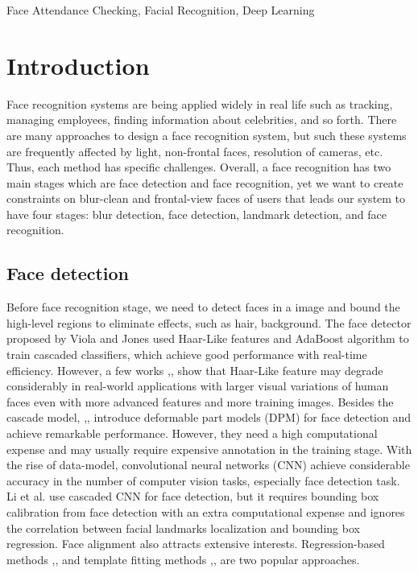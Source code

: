 \documentclass[journal, twocolumn]{IEEEtran}
\begin{document}
\begin{IEEEkeywords}
Face Attendance Checking, Facial Recognition, Deep Learning
\end{IEEEkeywords}


\IEEEpeerreviewmaketitle


\section{Introduction}
\label{introduction}

Face recognition systems are being applied widely in real life such as tracking, managing employees, finding information about celebrities, and so forth. There are many approaches to design a face recognition system, but such these systems are frequently affected by light, non-frontal faces, resolution of cameras, etc. Thus, each method has specific challenges. Overall, a face recognition has two main stages which are face detection and face recognition, yet we want to create constraints on blur-clean and frontal-view faces of users that leads our system to have four stages: blur detection, face detection, landmark detection, and face recognition.  


\subsection{Face detection}
Before face recognition stage, we need to detect faces in a image and bound the high-level regions to eliminate effects, such as hair, background. The face detector proposed by Viola and Jones \cite{ref:detect-1} used Haar-Like features and AdaBoost algorithm to train cascaded classifiers, which achieve good performance with real-time efficiency. However, a few works \cite{ref:detect-2},\cite{ref:detect-3},\cite{ref:detect-4} show that Haar-Like feature may degrade considerably in real-world applications with larger visual variations of human faces even with more advanced features and more training images. Besides the cascade model, \cite{ref:detect-5},\cite{ref:detect-6},\cite{ref:detect-7} introduce deformable part models (DPM) for face detection and achieve remarkable performance. However, they need a high computational expense and may usually require expensive annotation in the training stage. With the rise of data-model, convolutional neural networks (CNN) achieve considerable accuracy in the number of computer vision tasks, especially face detection task. Li et al. \cite{ref:detect-8} use cascaded CNN for face detection, but it requires bounding box calibration from face detection with an extra computational expense and ignores the correlation between facial landmarks localization and bounding box regression. Face alignment also attracts extensive interests. Regression-based methods \cite{ref:detect-9},\cite{ref:detect-10},\cite{ref:detect-11} and template fitting methods \cite{ref:detect-7},\cite{ref:detect-12},\cite{ref:detect-13} are two popular approaches.
\end{document}
